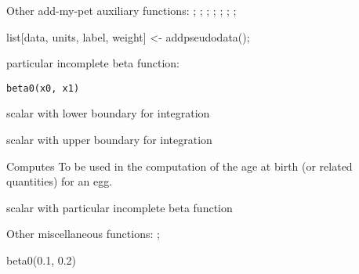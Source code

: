 \documentclass[a4paper]{book}
\begin{document}
%
\begin{SeeAlso}\relax
Other add-my-pet auxiliary functions: ;
; ;
; ;
;
; 
\end{SeeAlso}
%
\begin{Examples}
\begin{ExampleCode}
list[data, units, label, weight] <- addpseudodata();
\end{ExampleCode}
\end{Examples}
%
\begin{Description}\relax
particular incomplete beta function:
\end{Description}
%
\begin{Usage}
\begin{verbatim}
beta0(x0, x1)
\end{verbatim}
\end{Usage}
%
\begin{Arguments}
\begin{ldescription}
\item[\code{x0}] scalar with lower boundary for integration

\item[\code{x1}] scalar with upper boundary for integration
\end{ldescription}
\end{Arguments}
%
\begin{Details}\relax
Computes
To be used in the computation of the age at birth (or related quantities) for an egg.
\end{Details}
%
\begin{Value}
scalar with particular incomplete beta function
\end{Value}
%
\begin{SeeAlso}\relax
Other miscellaneous functions: ;
\end{SeeAlso}
%
\begin{Examples}
\begin{ExampleCode}
beta0(0.1, 0.2)
\end{ExampleCode}
\end{Examples}
\end{document}
